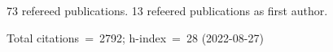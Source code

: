 73 refereed publications. 13 refeered publications as first author.

Total citations~=~2792; h-index~=~28 (2022-08-27)